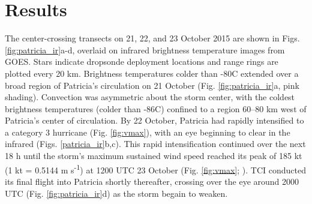\section{Results}

The center-crossing transects on 21, 22, and 23 October 2015 are shown in Figs. \ref{fig:patricia_ir}a-d, overlaid on infrared brightness temperature images from GOES.
Stars indicate dropsonde deployment locations and range rings are plotted every 20 km.
Brightness temperatures colder than -80\textdegree{}C extended over a broad region of Patricia’s circulation on 21 October (Fig. \ref{fig:patricia_ir}a, pink shading).
Convection was asymmetric about the storm center, with the coldest brightness temperatures (colder than -86\textdegree{}C) confined to a region 60–80 km west of Patricia’s center of circulation.
By 22 October, Patricia had rapidly intensified to a category 3 hurricane (Fig. \ref{fig:vmax}), with an eye beginning to clear in the infrared (Figs. \ref{patricia_ir}b,c).
This rapid intensification continued over the next 18 h until the storm’s maximum sustained wind speed reached its peak
of 185 kt (1 kt = 0.5144 m s\textsuperscript{-1}) at 1200 UTC 23 October (Fig. \ref{fig:vmax}; \citeauthor{Kimberlainetal2016} \citeyear{Kimberlainetal2016}).
TCI conducted its final flight into Patricia shortly thereafter, crossing over the eye around 2000 UTC (Fig. \ref{fig:patricia_ir}d) as the storm begain to weaken.

